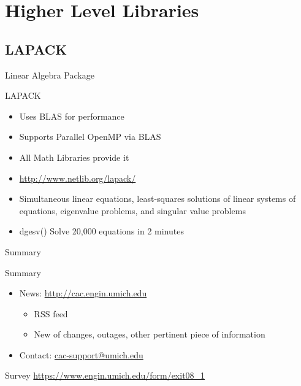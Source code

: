 \documentclass[handout]{beamer}
\begin{document}
\section{Higher Level Libraries}
\subsection{LAPACK}
\begin{frame}{Linear Algebra Package}
 \begin{block}{LAPACK}
  \begin{itemize}
   \item Uses BLAS for performance
   \item Supports Parallel OpenMP via BLAS
   \item All Math Libraries provide it
   \item \url{http://www.netlib.org/lapack/}
   \item Simultaneous linear equations, least-squares solutions of linear systems of equations, eigenvalue problems, and singular value problems
   \item dgesv() Solve 20,000 equations in 2 minutes
  \end{itemize}
 \end{block}
\end{frame}
\begin{frame}{Summary}
 \begin{block}{Summary}
 \begin{itemize}
 \item News: \url{http://cac.engin.umich.edu}
   \begin{itemize}
    \item RSS feed
    \item New of changes, outages, other pertinent piece of information
   \end{itemize}
  \item Contact: \url{cac-support@umich.edu}
 \end{itemize}
 \end{block}
 \begin{block}{Survey}
    \url{https://www.engin.umich.edu/form/exit08\_1}
 \end{block}
\end{frame}
\end{document}
